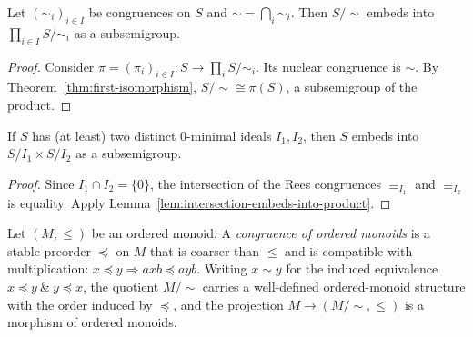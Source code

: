 \begin{lemma}
\label{lem:intersection-embeds-into-product}
Let \((\sim_i)_{i\in I}\) be congruences on \(S\) and \(\sim=\bigcap_i \sim_i\). Then \(S/{\sim}\) embeds into \(\prod_{i\in I} S/{\sim_i}\) as a subsemigroup.
\end{lemma}
\begin{proof}
Consider \(\pi=(\pi_i)_{i\in I}:S\to \prod_i S/{\sim_i}\). Its nuclear congruence is \(\sim\). By Theorem~\ref{thm:first-isomorphism}, \(S/{\sim}\cong \pi(S)\), a subsemigroup of the product.
\end{proof}

\begin{lemma}
\label{lem:zero-minimal-ideals-product-embed}
If \(S\) has (at least) two distinct \(0\)-minimal ideals \(I_1,I_2\), then \(S\) embeds into \(S/I_1 \times S/I_2\) as a subsemigroup.
\end{lemma}
\begin{proof}
Since \(I_1\cap I_2=\{0\}\), the intersection of the Rees congruences \(\equiv_{I_1}\) and \(\equiv_{I_2}\) is equality. Apply Lemma~\ref{lem:intersection-embeds-into-product}.
\end{proof}

\begin{definition}
\label{def:ordered-monoid-congruence}
Let \((M,\le)\) be an ordered monoid. A \emph{congruence of ordered monoids} is a stable preorder \(\preccurlyeq\) on \(M\) that is coarser than \(\le\) and is compatible with multiplication: \(x\preccurlyeq y\Rightarrow a x b \preccurlyeq a y b\). Writing \(x\sim y\) for the induced equivalence \(x\preccurlyeq y\ \&\ y\preccurlyeq x\), the quotient \(M/{\sim}\) carries a well-defined ordered-monoid structure with the order induced by \(\preccurlyeq\), and the projection \(M\to (M/{\sim},\le)\) is a morphism of ordered monoids.
\end{definition}
